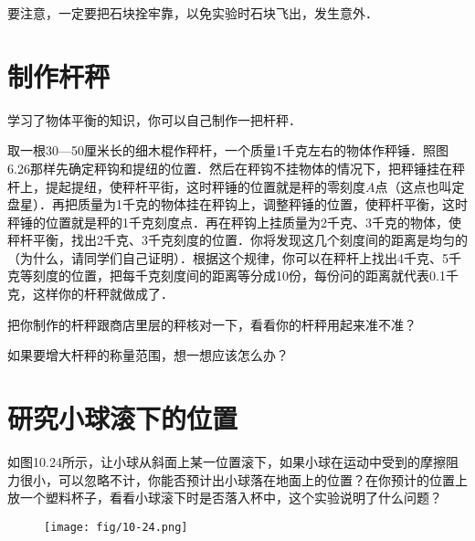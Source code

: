 要注意，一定要把石块拴牢靠，以免实验时石块飞出，发生意外．

\section{制作杆秤}
学习了物体平衡的知识，你可以自己制作一把杆秤．

取一根30—50厘米长的细木棍作秤杆，一个质量1千克左右的物体作秤锤．照图6.26那样先确定秤钩和提纽的位置．然后在秤钩不挂物体的情况下，把秤锤挂在秤杆上，提起提纽，使秤杆平街，这时秤锤的位置就是秤的零刻度$A$点（这点也叫定盘星）．再把质量为1千克的物体挂在秤钩上，调整秤锤的位置，使秤杆平衡，这时秤锤的位置就是秤的1千克刻度点．再在秤钩上挂质量为2千克、3千克的物体，使秤杆平衡，找出2千克、3千克刻度的位置．你将发现这几个刻度间的距离是均匀的（为什么，请同学们自己证明）．根据这个规律，你可以在秤杆上找出4千克、5千克等刻度的位置，把每千克刻度间的距离等分成10份，每份问的距离就代表0.1千克，这样你的杆秤就做成了．

把你制作的杆秤跟商店里层的秤核对一下，看看你的杆秤用起来准不准？

如果要增大杆秤的称量范围，想一想应该怎么办？

\section{研究小球滚下的位置}
如图10.24所示，让小球从斜面上某一位置滚下，如果小球在运动中受到的摩擦阻力很小，可以忽略不计，你能否预计出小球落在地面上的位置？在你预计的位置上放一个塑料杯子，看看小球滚下时是否落入杯中，这个实验说明了什么问题？
\begin{figure}[htp]\centering
    \texttt{[image: fig/10-24.png]}
    \caption{}
    \end{figure}

	

	
	
	
	
	
	
	
	
	
	
	
	
	
	
	

